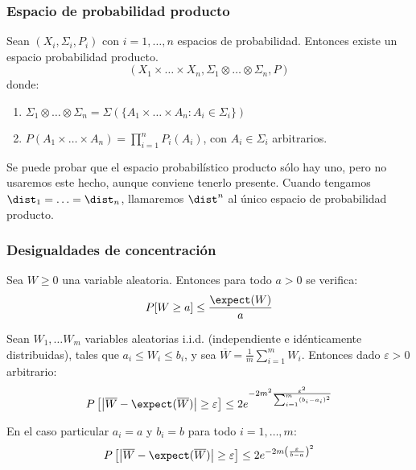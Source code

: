  \begin{frame}\frametitle{Espacio de probabilidad producto}
  \begin{theorem}
   Sean $(X_i, \Sigma_i, P_i)$ con $i=1,\ldots, n$ espacios de probabilidad. Entonces existe un espacio probabilidad
   producto.
   \[(X_1 \times \ldots \times X_n, \Sigma_1 \otimes \ldots \otimes \Sigma_n, P)\]
   donde:
   \begin{enumerate}[i]
   \item $\Sigma_1 \otimes \ldots \otimes \Sigma_n = \Sigma\left(\{A_1 \times \ldots \times A_n: A_i\in \Sigma_i\}\right)$
   \item $P(A_1 \times \ldots \times A_n) = \prod_{i=1}^n P_i(A_i)$, con $A_i\in \Sigma_i$ arbitrarios.
  \end{enumerate}
  \end{theorem}
  
  Se puede probar que el espacio probabilístico producto sólo hay uno, pero no usaremos este hecho, aunque conviene tenerlo
  presente. Cuando tengamos $\dist_1 = \ldots = \dist_n$, llamaremos $\dist^n$ al único espacio de probabilidad producto.
 \end{frame}
 
 \begin{frame}\frametitle{Desigualdades de concentración}
 \begin{lemma}
  Sea $W \ge 0$ una variable aleatoria. Entonces para todo $a > 0$ se verifica:
  \[
    P[W \ge a] \le \frac{\expect(W)}{a}
  \]
  \label{ineq:markov}
 \end{lemma}
  
  \begin{lemma}
   Sean $W_1, \ldots W_m$ variables aleatorias i.i.d. (independiente e idénticamente distribuidas), tales que 
   $a_i \le W_i \le b_i$, y sea $\overline{W} = \frac{1}{m} \sum_{i=1}^m W_i$. Entonces dado $\varepsilon > 0$ arbitrario:
   \[
     P\left[\left| \overline{W} - \expect(\overline{W}) \right| \ge \varepsilon \right] \le 2e^{-2m^2 \frac{\varepsilon^2}{\sum_{i=1}^m (b_i-a_i)^2}}
   \]
   
   En el caso particular $a_i = a$ y $b_i = b$ para todo $i=1, \ldots, m$:
   \[
     P\left[\left| \overline{W} - \expect(\overline{W}) \right| \ge \varepsilon \right] \le 2e^{-2m \left(\frac{\varepsilon}{b-a}\right)^2}
   \] 
   \label{ineq:hoeffding}
  \end{lemma}
 \end{frame}